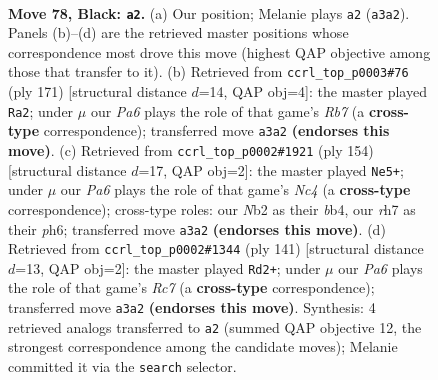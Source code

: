 \documentclass[11pt]{article}
\begin{document}
\clearpage

\begin{figure}[p]\centering
\begin{subfigure}{0.46\textwidth}\centering
\resizebox{\linewidth}{!}{%
\newchessgame
\chessboard[
  setfen={8/7R/6pP/3k1p2/5P2/p7/1n4K1/8 b - - 3 78},
  showmover=false,
  pgfstyle=straightmove, color=movearrow, markmove={a3-a2}
]}
\caption{}
\end{subfigure}\hfill
\begin{subfigure}{0.46\textwidth}\centering
\resizebox{\linewidth}{!}{%
\newchessgame
\chessboard[
  setfen={R7/P4kp1/2K4p/7P/8/8/1r6/8 b - - 14 86},
  showmover=false,
  pgfstyle=straightmove, color=movearrow, markmove={b2-a2}
]}
\caption{}
\end{subfigure}
\\[4pt]
\begin{subfigure}{0.46\textwidth}\centering
\resizebox{\linewidth}{!}{%
\newchessgame
\chessboard[
  setfen={8/3K1k2/7p/5p2/1bN2P2/4P3/7P/8 w - - 69 78},
  showmover=false,
  pgfstyle=straightmove, color=movearrow, markmove={c4-e5}
]}
\caption{}
\end{subfigure}\hfill
\begin{subfigure}{0.46\textwidth}\centering
\resizebox{\linewidth}{!}{%
\newchessgame
\chessboard[
  setfen={1R6/1P4k1/3K4/7p/5p1P/8/2r5/8 b - - 3 71},
  showmover=false,
  pgfstyle=straightmove, color=movearrow, markmove={c2-d2}
]}
\caption{}
\end{subfigure}
\caption{\textbf{Move 78, Black: \texttt{a2}.} (a) Our position; Melanie plays \texttt{a2} (\texttt{a3a2}). Panels (b)--(d) are the retrieved master positions whose correspondence most drove this move (highest QAP objective among those that transfer to it). (b) Retrieved from \texttt{ccrl\_top\_p0003\#76} (ply 171) [structural distance $d$=14, QAP obj=4]: the master played \texttt{Ra2}; under $\mu$ our \emph{Pa6} plays the role of that game's \emph{Rb7} (a \textbf{cross-type} correspondence); transferred move \texttt{a3a2} \textbf{(endorses this move)}. (c) Retrieved from \texttt{ccrl\_top\_p0002\#1921} (ply 154) [structural distance $d$=17, QAP obj=2]: the master played \texttt{Ne5+}; under $\mu$ our \emph{Pa6} plays the role of that game's \emph{Nc4} (a \textbf{cross-type} correspondence); cross-type roles: our \emph{N}b2 as their \emph{b}b4, our \emph{r}h7 as their \emph{p}h6; transferred move \texttt{a3a2} \textbf{(endorses this move)}. (d) Retrieved from \texttt{ccrl\_top\_p0002\#1344} (ply 141) [structural distance $d$=13, QAP obj=2]: the master played \texttt{Rd2+}; under $\mu$ our \emph{Pa6} plays the role of that game's \emph{Rc7} (a \textbf{cross-type} correspondence); transferred move \texttt{a3a2} \textbf{(endorses this move)}. Synthesis: 4 retrieved analogs transferred to \texttt{a2} (summed QAP objective 12, the strongest correspondence among the candidate moves); Melanie committed it via the \texttt{search} selector.}
\label{fig:thought-m155}
\end{figure}
\end{document}
